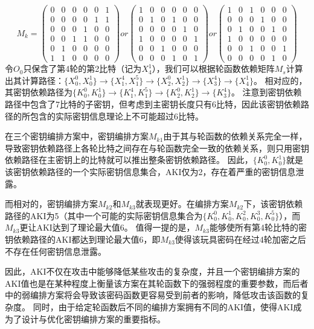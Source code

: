 $$M_k=\left(
    \begin{array}{cccccc}
        0&0&0&0&0&1\\
        0&0&0&0&1&1\\
        0&0&0&1&0&0\\
        0&0&1&1&0&0\\
        0&1&0&0&0&0\\
        1&1&0&0&0&0
    \end{array}
\right)
or\left(
    \begin{array}{cccccc}
        1&0&0&0&0&0\\
        0&1&0&1&0&0\\
        0&0&0&0&1&0\\
        1&0&0&0&0&1\\
        0&0&1&0&0&0\\
        0&0&0&1&0&1
    \end{array}
\right)
or\left(
    \begin{array}{cccccc}
        1&0&1&0&0&0\\
        0&0&0&1&0&0\\
        0&1&0&0&1&0\\
        1&0&0&0&0&0\\
        0&0&1&0&0&1\\
        0&0&0&0&1&0
    \end{array}
\right)$$
令$O_0$只保含了第4轮的第2比特（记为$X_4^1$），我们可以根据轮函数依赖矩阵$M_s$计算出其计算路径：$\{X_0^0,X_0^1\}\rightarrow \{X_1^4,X_1^5\}\rightarrow \{X_2^0,X_2^1\}\rightarrow \{X_3^4\}\rightarrow \{X_4^1\}$。
相对应的，其密钥依赖路径为$\{K_0^0,K_0^1\}\rightarrow \{K_1^4,K_1^5\}\rightarrow \{K_2^0,K_2^1\}\rightarrow \{K_3^4\}$。
注意到密钥依赖路径中包含了7比特的子密钥，但考虑到主密钥长度只有6比特，因此该密钥依赖路径的所包含的实际密钥信息理论上不可能超过6比特。

在三个密钥编排方案中，密钥编排方案$M_{k1}$由于其与轮函数的依赖关系完全一样，导致密钥依赖路径上各轮比特之间存在与轮函数完全一致的依赖关系，则只用密钥依赖路径在主密钥上的比特就可以推出整条密钥依赖路径。
因此，$\{K_0^0,K_0^1\}$就是该密钥依赖路径的一个实际密钥信息集合，AKI仅为2，存在着严重的密钥信息泄露。

而相对的，密钥编排方案$M_{k2}$和$M_{k3}$就表现更好。在编排方案$M_{k2}$下，该密钥依赖路径的AKI为5（其中一个可能的实际密钥信息集合为$\{K_0^0,K_0^1,K_0^2,K_0^3,K_0^5\}$），而$M_{k3}$更让AKI达到了理论最大值6。
值得一提的是，$M_{k3}$能够使所有第4轮比特的密钥依赖路径的AKI都达到理论最大值6，即$M_{k3}$使得该玩具密码在经过4轮加密之后不存在任何密钥信息泄露。

因此，AKI不仅在攻击中能够降低某些攻击的复杂度，并且一个密钥编排方案的AKI值也是在某种程度上衡量该方案在其轮函数下的强弱程度的重要参数，而后者中的弱编排方案将会导致该密码函数更容易受到前者的影响，降低攻击该函数的复杂度。
同时，由于给定轮函数后不同的编排方案拥有不同的AKI值，使得AKI成为了设计与优化密钥编排方案的重要指标。
